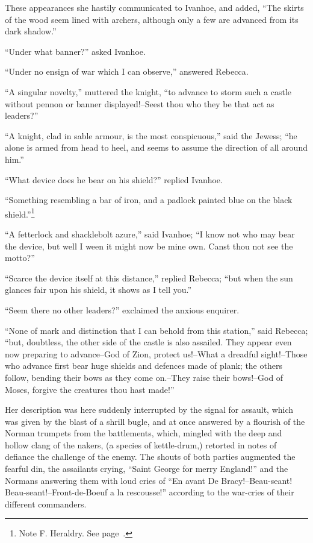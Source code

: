 These appearances she hastily communicated to Ivanhoe, and added, ``The
skirts of the wood seem lined with archers, although only a few are
advanced from its dark shadow.''

``Under what banner?'' asked Ivanhoe.

``Under no ensign of war which I can observe,'' answered Rebecca.

``A singular novelty,'' muttered the knight, ``to advance to storm such
a castle without pennon or banner displayed!--Seest thou who they be
that act as leaders?''

``A knight, clad in sable armour, is the most conspicuous,'' said the
Jewess; ``he alone is armed from head to heel, and seems to assume the
direction of all around him.''

``What device does he bear on his shield?'' replied Ivanhoe.

``Something resembling a bar of iron, and a padlock painted blue on the
black shield.''\footnote{Note F. Heraldry. See page~\pageref{noteCXXIX}.}

``A fetterlock and shacklebolt azure,'' said Ivanhoe; ``I know not who
may bear the device, but well I ween it might now be mine own. Canst
thou not see the motto?''

``Scarce the device itself at this distance,'' replied Rebecca; ``but
when the sun glances fair upon his shield, it shows as I tell you.''

``Seem there no other leaders?'' exclaimed the anxious enquirer.

``None of mark and distinction that I can behold from this station,''
said Rebecca; ``but, doubtless, the other side of the castle is also
assailed. They appear even now preparing to advance--God of Zion,
protect us!--What a dreadful sight!--Those who advance first bear huge
shields and defences made of plank; the others follow, bending their
bows as they come on.--They raise their bows!--God of Moses, forgive the
creatures thou hast made!''

Her description was here suddenly interrupted by the signal for assault,
which was given by the blast of a shrill bugle, and at once answered by
a flourish of the Norman trumpets from the battlements, which, mingled
with the deep and hollow clang of the nakers, (a species of
kettle-drum,) retorted in notes of defiance the challenge of the enemy.
The shouts of both parties augmented the fearful din, the assailants
crying, ``Saint George for merry England!'' and the Normans answering
them with loud cries of ``En avant De Bracy!--Beau-seant!
Beau-seant!--Front-de-Boeuf a la rescousse!'' according to the war-cries
of their different commanders.

